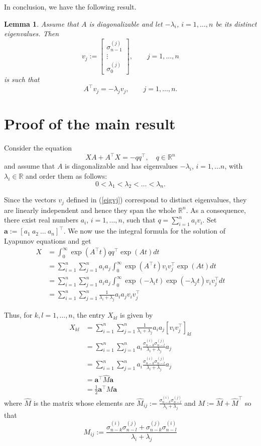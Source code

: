 \documentclass[12pt]{article}
\def\R{\mathbb{R}}
\newcommand{\tp}{^{\top}}
\newcommand{\beq}{\begin{equation}}
\newcommand{\eeq}{\end{equation}}
\newcommand{\nn}{\nonumber}
\newtheorem{lemma}{Lemma}[section]
\begin{document}
In conclusion, we have the following result.
\begin{lemma}
Assume that $A$ is diagonalizable and let $-\lambda_i$, $i=1,\dots,n$ be its distinct eigenvalues.
Then
\beq\label{eigvj}
v_j:=\begin{bmatrix} \sigma_{n-1}^{(j)}\\ \vdots\\ \sigma_0^{(j)}\end{bmatrix},\qquad j=1,\dots,n
\eeq
is such that
$$
A\tp v_j=-\lambda_j v_j,\qquad j=1,\dots,n.$$
\end{lemma}




\section{Proof of the main result}


Consider the equation 
\beq
\label{lyap-red}
XA+A\tp X=-qq\tp,\quad q\in\R^n
\eeq
and assume that $A$ is diagonalizable and has eigenvalues
$-\lambda_i$, $i=1,\dots n$, with $\lambda_i\in\R$ 
and order them as follows:
$$0<\lambda_1 < \lambda_2 <\dots< \lambda_n.
$$

Since the vectors $v_j$ defined in (\ref{eigvj}) correspond to distinct eigenvalues, they are linearly independent and hence they span the whole $\R^n$.
As a consequence, there exist real numbers $a_i$, $i=1,\dots,n$, such that
$q=\sum_{i=1}^n a_i v_i$.
Set $\mathbf{a}:=[a_1\ a_2\ \dots\  a_n]^\top$.
We now use the integral formula for the solution of Lyapunov equations and get
\begin{align} \nn
X&=\int_{0}^{\infty}\exp(A\tp t)qq\tp\exp(A t)dt 
\\
\nn
&=
  \sum_{i=1}^n
  \sum_{j=1}^n
  a_ia_j
  \int_{0}^{\infty}\exp(A\tp t)v_i v_j\tp\exp(A t)dt 
  \\
  \nn
  &=
  \sum_{i=1}^n
  \sum_{j=1}^n
  a_ia_j
  \int_{0}^{\infty}\exp(-\lambda_i t)\exp(-\lambda_j t) v_i v_j\tp dt 
  \\
  &=
  \sum_{i=1}^n
  \sum_{j=1}^n
  \frac{1}{\lambda_i +\lambda_j}
  a_ia_j v_i v_j\tp 
\end{align} 

Thus, for $k,l=1,\dots,n$, the entry $X_{kl}$ is given by
\begin{align} \nn
X_{kl}&=
  \sum_{i=1}^n
  \sum_{j=1}^n
  \frac{1}{\lambda_i +\lambda_j}
  a_ia_j [v_i v_j\tp]_{kl}\\
  \nn
  &=
  \sum_{i=1}^n
  \sum_{j=1}^n
  a_i
  \frac{\sigma_{n-k}^{(i)}\sigma_{n-l}^{(j)}}{\lambda_i +\lambda_j}
  a_j\\
  \nn
  &=
  \sum_{i=1}^n
  \sum_{j=1}^n
  a_i
  \frac{\sigma_{n-k}^{(i)}\sigma_{n-l}^{(j)}}{\lambda_i +\lambda_j}
  a_j\\
  \nn
  &=
  \mathbf{a}^\top \hat{M} \mathbf{a}\\
 &=
  \frac{1}{2} \mathbf{a}^\top M \mathbf{a}
\end{align}
where $\hat{M}$ is the matrix whose elements are $\hat{M}_{ij}:=\frac{\sigma_{n-k}^{(i)}\sigma_{n-l}^{(j)}}{\lambda_i +\lambda_j}$ and $M:=\hat{M}+\hat{M}\tp$ so that 
$$M_{ij}:=\frac{\sigma_{n-k}^{(i)}\sigma_{n-l}^{(j)}+\sigma_{n-k}^{(j)}\sigma_{n-l}^{(i)}}{\lambda_i +\lambda_j}$$
\end{document}
